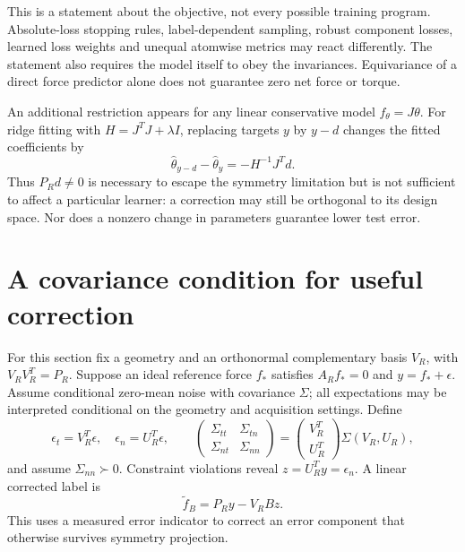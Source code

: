 \documentclass[11pt]{article}
\begin{document}
This is a statement about the objective, not every possible training program.
Absolute-loss stopping rules, label-dependent sampling, robust component losses,
learned loss weights and unequal atomwise metrics may react differently. The
statement also requires the model itself to obey the invariances. Equivariance of
a direct force predictor alone does not guarantee zero net force or torque.

An additional restriction appears for any linear conservative model $f_\theta=J\theta$.
For ridge fitting with $H=J^TJ+\lambda I$, replacing targets $y$ by $y-d$ changes
the fitted coefficients by
\begin{equation}\label{eq:response}
 \widehat\theta_{y-d}-\widehat\theta_y=-H^{-1}J^Td.
\end{equation}
Thus $P_Rd\ne0$ is necessary to escape the symmetry limitation but is not sufficient
to affect a particular learner: a correction may still be orthogonal to its design
space. Nor does a nonzero change in parameters guarantee lower test error.

\section{A covariance condition for useful correction}
For this section fix a geometry and an orthonormal complementary basis $V_R$, with
$V_RV_R^T=P_R$. Suppose an ideal reference force $f_*$ satisfies $A_Rf_*=0$ and
$y=f_*+\epsilon$. Assume conditional zero-mean noise with covariance $\Sigma$;
all expectations may be interpreted conditional on the geometry and acquisition
settings. Define
\begin{equation}
 \epsilon_t=V_R^T\epsilon,\quad \epsilon_n=U_R^T\epsilon,
 \qquad
 \begin{pmatrix}\Sigma_{tt}&\Sigma_{tn}\\\Sigma_{nt}&\Sigma_{nn}\end{pmatrix}
 =\begin{pmatrix}V_R^T\\U_R^T\end{pmatrix}\Sigma(V_R,U_R),
\end{equation}
and assume $\Sigma_{nn}\succ0$. Constraint violations reveal
$z=U_R^Ty=\epsilon_n$. A linear corrected label is
\begin{equation}\label{eq:correct}
 \widetilde f_B=P_Ry-V_RBz.
\end{equation}
This uses a measured error indicator to correct an error component that otherwise
survives symmetry projection.
\end{document}
